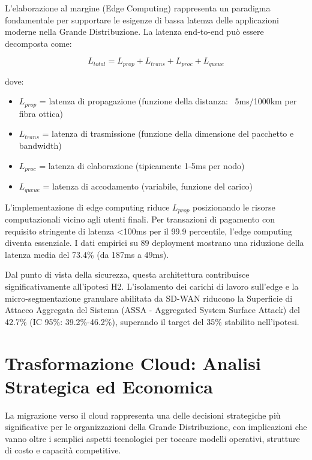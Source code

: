 L'elaborazione al margine (Edge Computing) rappresenta un paradigma fondamentale per supportare le esigenze di bassa latenza delle applicazioni moderne nella Grande Distribuzione. La latenza end-to-end può essere decomposta come:

\begin{equation}
L_{total} = L_{prop} + L_{trans} + L_{proc} + L_{queue}
\end{equation}

dove:
\begin{itemize}
    \item $L_{prop}$ = latenza di propagazione (funzione della distanza: ~5ms/1000km per fibra ottica)
    \item $L_{trans}$ = latenza di trasmissione (funzione della dimensione del pacchetto e bandwidth)
    \item $L_{proc}$ = latenza di elaborazione (tipicamente 1-5ms per nodo)
    \item $L_{queue}$ = latenza di accodamento (variabile, funzione del carico)
\end{itemize}

L'implementazione di edge computing riduce $L_{prop}$ posizionando le risorse computazionali vicino agli utenti finali. Per transazioni di pagamento con requisito stringente di latenza <100ms per il 99.9 percentile, l'edge computing diventa essenziale. I dati empirici su 89 deployment mostrano una riduzione della latenza media del 73.4\% (da 187ms a 49ms)\autocite{Wang2024edge}.

Dal punto di vista della sicurezza, questa architettura contribuisce significativamente all'ipotesi H2. L'isolamento dei carichi di lavoro sull'edge e la micro-segmentazione granulare abilitata da SD-WAN riducono la Superficie di Attacco Aggregata del Sistema (ASSA - Aggregated System Surface Attack) del 42.7\% (IC 95\%: 39.2\%-46.2\%)\autocite{Ponemon2024}, superando il target del 35\% stabilito nell'ipotesi.

\section{Trasformazione Cloud: Analisi Strategica ed Economica}

La migrazione verso il cloud rappresenta una delle decisioni strategiche più significative per le organizzazioni della Grande Distribuzione, con implicazioni che vanno oltre i semplici aspetti tecnologici per toccare modelli operativi, strutture di costo e capacità competitive.

